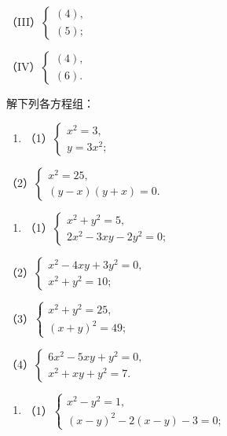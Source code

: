 （III）\(\left\{ \begin{array}{l} (4), \\ (5); \end{array} \right.\)

（IV）\(\left\{ \begin{array}{l} (4), \\ (6). \end{array} \right.\)

解下列各方程组：

\begin{enumerate}
\item
  （1）\(\left\{ \begin{array}{l} x^{2} = 3, \\ y = 3x^{2}; \end{array} \right.\)
\end{enumerate}

（2）\(\left\{ \begin{array}{l} x^{2} = 25, \\ (y - x)(y + x) = 0. \end{array} \right.\)

\begin{enumerate}[start=2]
\item
  （1）\(\left\{ \begin{array}{l} x^{2} + y^{2} = 5, \\ 2x^{2} - 3xy - 2y^{2} = 0; \end{array} \right.\)
\end{enumerate}

（2）\(\left\{ \begin{array}{l} x^{2} - 4xy + 3y^{2} = 0, \\ x^{2} + y^{2} = 10; \end{array} \right.\)

（3）\(\left\{ \begin{array}{l} x^{2} + y^{2} = 25, \\ (x + y)^{2} = 49; \end{array} \right.\)

（4）\(\left\{ \begin{array}{l} 6x^{2} - 5xy + y^{2} = 0, \\ x^{2} + xy + y^{2} = 7. \end{array} \right.\)

\begin{enumerate}[start=3]
\item
  （1）\(\left\{ \begin{array}{l} x^{2} - y^{2} = 1, \\ (x - y)^{2} - 2(x - y) - 3 = 0; \end{array} \right.\)
\end{enumerate}

